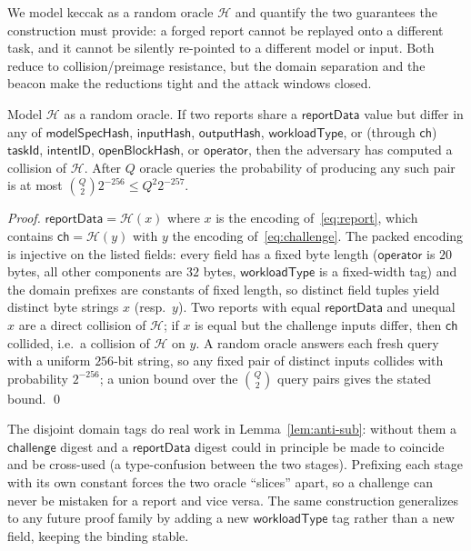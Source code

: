 We model keccak as a random oracle $\mathcal{H}$ and quantify the two guarantees
the construction must provide: a forged report cannot be replayed onto a different
task, and it cannot be silently re-pointed to a different model or input. Both
reduce to collision/preimage resistance, but the domain separation and the beacon
make the reductions tight and the attack windows closed.

\begin{lemma}
\label{lem:anti-sub}
Model $\mathcal{H}$ as a random oracle. If two reports share a $\mathsf{reportData}$
value but differ in any of $\mathsf{modelSpecHash}$, $\mathsf{inputHash}$,
$\mathsf{outputHash}$, $\mathsf{workloadType}$, or (through $\mathsf{ch}$)
$\mathsf{taskId}$, $\mathsf{intentID}$, $\mathsf{openBlockHash}$, or
$\mathsf{operator}$, then the adversary has computed a collision of $\mathcal{H}$.
After $Q$ oracle queries the probability of producing any such pair is at most
$\binom{Q}{2} 2^{-256} \le Q^2 2^{-257}$.
\end{lemma}

\begin{proof}
$\mathsf{reportData} = \mathcal{H}(x)$ where $x$ is the encoding
of~\eqref{eq:report}, which contains $\mathsf{ch} = \mathcal{H}(y)$ with $y$ the
encoding of~\eqref{eq:challenge}. The packed encoding is injective on the listed
fields: every field has a fixed byte length ($\mathsf{operator}$ is $20$ bytes, all
other components are $32$ bytes, $\mathsf{workloadType}$ is a fixed-width tag) and
the domain prefixes are constants of fixed length, so distinct field tuples yield
distinct byte strings $x$ (resp.\ $y$). Two reports with equal $\mathsf{reportData}$
and unequal $x$ are a direct collision of $\mathcal{H}$; if $x$ is equal but the
challenge inputs differ, then $\mathsf{ch}$ collided, i.e.\ a collision of
$\mathcal{H}$ on $y$. A random oracle answers each fresh query with a uniform
$256$-bit string, so any fixed pair of distinct inputs collides with probability
$2^{-256}$; a union bound over the $\binom{Q}{2}$ query pairs gives the stated
bound. \qed
\end{proof}

The disjoint domain tags do real work in Lemma~\ref{lem:anti-sub}: without them a
$\mathsf{challenge}$ digest and a $\mathsf{reportData}$ digest could in principle be
made to coincide and be cross-used (a type-confusion between the two stages).
Prefixing each stage with its own constant forces the two oracle ``slices'' apart,
so a challenge can never be mistaken for a report and vice versa. The same
construction generalizes to any future proof family by adding a new
$\mathsf{workloadType}$ tag rather than a new field, keeping the binding stable.

